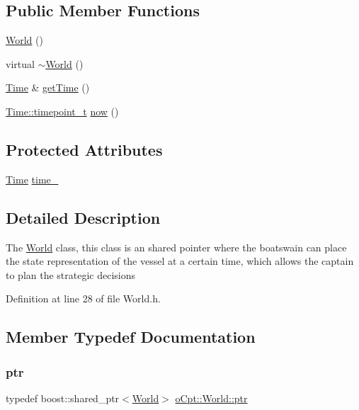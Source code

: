 \subsection*{Public Member Functions}
\begin{DoxyCompactItemize}
\item 
\hyperlink{classo_cpt_1_1_world_adc3d3e562ec4f5979b8da40bf8bef36c}{World} ()
\item 
virtual \hyperlink{classo_cpt_1_1_world_a74dd3c254805c7dd16353b7b7e93dc45}{$\sim$\+World} ()
\item 
\hyperlink{classo_cpt_1_1_world_1_1_time}{Time} \& \hyperlink{classo_cpt_1_1_world_a505f4c14270cfd34d806bd04c4b67f95}{get\+Time} ()
\item 
\hyperlink{classo_cpt_1_1_world_1_1_time_a6a6e782c3c90622c1c7070b0a223ec4c}{Time\+::timepoint\+\_\+t} \hyperlink{classo_cpt_1_1_world_a82235ee23e403f81d38c04b813cdeb23}{now} ()
\end{DoxyCompactItemize}
\subsection*{Protected Attributes}
\begin{DoxyCompactItemize}
\item 
\hyperlink{classo_cpt_1_1_world_1_1_time}{Time} \hyperlink{classo_cpt_1_1_world_a2f93632f34dd13d0a61eec6d8d2879ff}{time\+\_\+}
\end{DoxyCompactItemize}


\subsection{Detailed Description}
The \hyperlink{classo_cpt_1_1_world}{World} class, this class is an shared pointer where the boatswain can place the state representation of the vessel at a certain time, which allows the captain to plan the strategic decisions 

Definition at line 28 of file World.\+h.



\subsection{Member Typedef Documentation}
\hypertarget{classo_cpt_1_1_world_aa6e591e3096d5de71e0cec9039663d67}{}\label{classo_cpt_1_1_world_aa6e591e3096d5de71e0cec9039663d67} 
\subsubsection{\texorpdfstring{ptr}{ptr}}
{\footnotesize\ttfamily typedef boost\+::shared\+\_\+ptr$<$\hyperlink{classo_cpt_1_1_world}{World}$>$ \hyperlink{classo_cpt_1_1_world_aa6e591e3096d5de71e0cec9039663d67}{o\+Cpt\+::\+World\+::ptr}}



